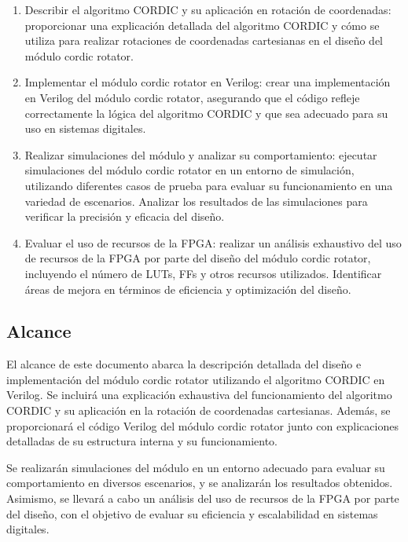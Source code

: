 \documentclass[12pt,a4paper, twoside]{article} %
\begin{document}
\begin{enumerate}

\item Describir el algoritmo CORDIC y su aplicación en rotación de coordenadas: proporcionar una explicación detallada del algoritmo CORDIC y cómo se utiliza para realizar rotaciones de coordenadas cartesianas en el diseño del módulo cordic rotator.

\item Implementar el módulo cordic rotator en Verilog: crear una implementación en Verilog del módulo cordic rotator, asegurando que el código refleje correctamente la lógica del algoritmo CORDIC y que sea adecuado para su uso en sistemas digitales.

\item Realizar simulaciones del módulo y analizar su comportamiento: ejecutar simulaciones del módulo cordic rotator en un entorno de simulación, utilizando diferentes casos de prueba para evaluar su funcionamiento en una variedad de escenarios. Analizar los resultados de las simulaciones para verificar la precisión y eficacia del diseño.

\item Evaluar el uso de recursos de la FPGA: realizar un análisis exhaustivo del uso de recursos de la FPGA por parte del diseño del módulo cordic rotator, incluyendo el número de LUTs, FFs y otros recursos utilizados. Identificar áreas de mejora en términos de eficiencia y optimización del diseño.

\end{enumerate}


\subsection{Alcance}
\label{subsec:org12e44a2}

El alcance de este documento abarca la descripción detallada del diseño e implementación del módulo cordic rotator utilizando el algoritmo CORDIC en Verilog. Se incluirá una explicación exhaustiva del funcionamiento del algoritmo CORDIC y su aplicación en la rotación de coordenadas cartesianas. Además, se proporcionará el código Verilog del módulo cordic rotator junto con explicaciones detalladas de su estructura interna y su funcionamiento.

 Se realizarán simulaciones del módulo en un entorno adecuado para evaluar su comportamiento en diversos escenarios, y se analizarán los resultados obtenidos. Asimismo, se llevará a cabo un análisis del uso de recursos de la FPGA por parte del diseño, con el objetivo de evaluar su eficiencia y escalabilidad en sistemas digitales.
\end{document}
